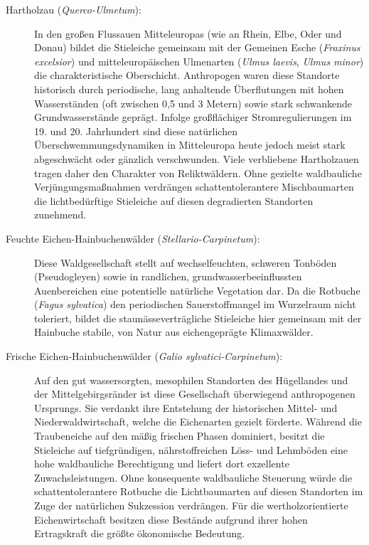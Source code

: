 \documentclass[twocolumn, bibliography=totoc, abstract=true]{scrartcl}
\begin{document}
\begin{description}
\item[Hartholzau (\textit{Querco-Ulmetum}):] In den großen Flussauen Mitteleuropas (wie an Rhein, Elbe, Oder und Donau) bildet die Stieleiche gemeinsam mit der Gemeinen Esche (\textit{Fraxinus excelsior}) und mitteleuropäischen Ulmenarten (\textit{Ulmus laevis}, \textit{Ulmus minor}) die charakteristische Oberschicht. Anthropogen waren diese Standorte historisch durch periodische, lang anhaltende Überflutungen mit hohen Wasserständen (oft zwischen 0,5 und 3 Metern) sowie stark schwankende Grundwasserstände geprägt. Infolge großflächiger Stromregulierungen im 19. und 20. Jahrhundert sind diese natürlichen Überschwemmungsdynamiken in Mitteleuropa heute jedoch meist stark abgeschwächt oder gänzlich verschwunden. Viele verbliebene Hartholzauen tragen daher den Charakter von Reliktwäldern. Ohne gezielte waldbauliche Verjüngungsmaßnahmen verdrängen schattentolerantere Mischbaumarten die lichtbedürftige Stieleiche auf diesen degradierten Standorten zunehmend.
\item[Feuchte Eichen-Hainbuchenwälder (\textit{Stellario-Carpinetum}):] Diese Waldgesellschaft stellt auf wechselfeuchten, schweren Tonböden (Pseudogleyen) sowie in randlichen, grundwasserbeeinflussten Auenbereichen eine potentielle natürliche Vegetation dar. Da die Rotbuche (\textit{Fagus sylvatica}) den periodischen Sauerstoffmangel im Wurzelraum nicht toleriert, bildet die staunässeverträgliche Stieleiche hier gemeinsam mit der Hainbuche stabile, von Natur aus eichengeprägte Klimaxwälder.
\item[Frische Eichen-Hainbuchenwälder (\textit{Galio sylvatici-Carpinetum}):] Auf den gut wassersorgten, mesophilen Standorten des Hügellandes und der Mittelgebirgsränder ist diese Gesellschaft überwiegend anthropogenen Ursprungs. Sie verdankt ihre Entstehung der historischen Mittel- und Niederwaldwirtschaft, welche die Eichenarten gezielt förderte. Während die Traubeneiche auf den mäßig frischen Phasen dominiert, besitzt die Stieleiche auf tiefgründigen, nährstoffreichen Löss- und Lehmböden eine hohe waldbauliche Berechtigung und liefert dort exzellente Zuwachsleistungen. Ohne konsequente waldbauliche Steuerung würde die schattentolerantere Rotbuche die Lichtbaumarten auf diesen Standorten im Zuge der natürlichen Sukzession verdrängen. Für die wertholzorientierte Eichenwirtschaft besitzen diese Bestände aufgrund ihrer hohen Ertragskraft die größte ökonomische Bedeutung.

\end{description}
\end{document}
